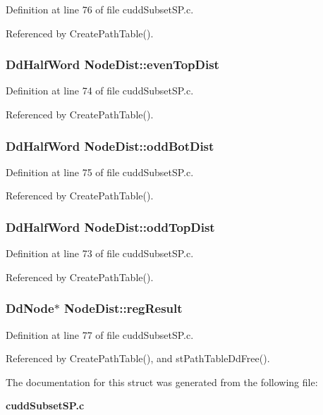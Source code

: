 Definition at line 76 of file cudd\-Subset\-SP.c.

Referenced by Create\-Path\-Table().
\subsubsection{\setlength{\rightskip}{0pt plus 5cm}\bf{Dd\-Half\-Word} \bf{Node\-Dist::even\-Top\-Dist}}\label{structNodeDist_75298ea49f72d125d211b373580823d4}




Definition at line 74 of file cudd\-Subset\-SP.c.

Referenced by Create\-Path\-Table().
\subsubsection{\setlength{\rightskip}{0pt plus 5cm}\bf{Dd\-Half\-Word} \bf{Node\-Dist::odd\-Bot\-Dist}}\label{structNodeDist_392f9f2aa7e3661789d8b8db4c86f35c}




Definition at line 75 of file cudd\-Subset\-SP.c.

Referenced by Create\-Path\-Table().
\subsubsection{\setlength{\rightskip}{0pt plus 5cm}\bf{Dd\-Half\-Word} \bf{Node\-Dist::odd\-Top\-Dist}}\label{structNodeDist_a84d095daafba6ee5192086bb3fde156}




Definition at line 73 of file cudd\-Subset\-SP.c.

Referenced by Create\-Path\-Table().
\subsubsection{\setlength{\rightskip}{0pt plus 5cm}\bf{Dd\-Node}$\ast$ \bf{Node\-Dist::reg\-Result}}\label{structNodeDist_9de182bb13d736ad500acdb603dca578}




Definition at line 77 of file cudd\-Subset\-SP.c.

Referenced by Create\-Path\-Table(), and st\-Path\-Table\-Dd\-Free().

The documentation for this struct was generated from the following file:\begin{CompactItemize}
\item 
\bf{cudd\-Subset\-SP.c}\end{CompactItemize}
